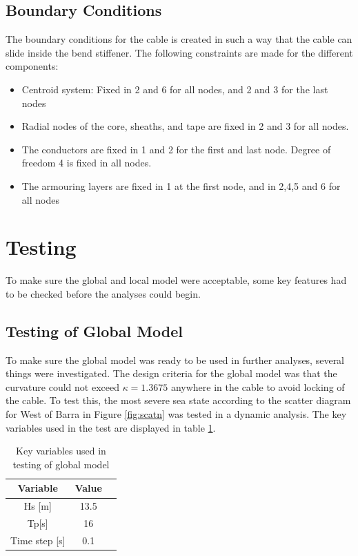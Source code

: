\subsection{Boundary Conditions}
The boundary conditions for the cable is created in such a way that the cable can slide inside the bend stiffener. The following constraints are made for the different components:
\begin{itemize}
    \item Centroid system: Fixed in 2 and 6 for all nodes, and 2 and 3 for the last nodes
    \item Radial nodes of the core, sheaths, and tape are fixed in 2 and 3 for all nodes. 
    \item The conductors are fixed in 1 and 2 for the first and last node. Degree of freedom 4 is fixed in all nodes.
    \item The armouring layers are fixed in 1 at the first node, and in 2,4,5 and 6 for all nodes
\end{itemize}

\section {Testing}
\label{sec:localtest}
To make sure the global and local model were acceptable, some key features had to be checked before the analyses could begin. 
\subsection{Testing of Global Model}
To make sure the global model was ready to be used in further analyses, several things were investigated. The design criteria for the global model was that the curvature could not exceed $\kappa=1.3675$ anywhere in the cable to avoid locking of the cable. To test this, the most severe sea state according to the scatter diagram for West of Barra in Figure \ref{fig:scatn} was tested in a dynamic analysis. The key variables used in the test are displayed in table \ref{table:testglob}.

\begin{table} [H]
\centering
\begin{tabular}{ |c|c|c|}
\hline
Variable & Value \\
 \hline
 \hline
Hs [m] & 13.5\\
Tp[s] & 16 \\
Time step [s] & 0.1 \\
 \hline
\end{tabular}
\caption{Key variables used in testing of global model}
\label{table:testglob}
\end{table}

